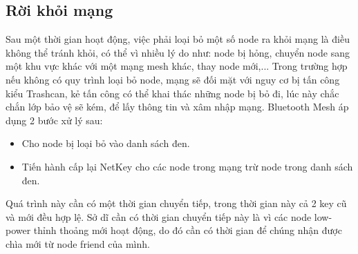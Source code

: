         \subsection{Rời khỏi mạng} \label{removenode}
        Sau một thời gian hoạt động, việc phải loại bỏ một số node ra khỏi mạng là điều không thể tránh khỏi, có thể vì nhiều lý do như: node bị hỏng, chuyển node sang một khu vực khác với một mạng mesh khác, thay node mới,... Trong trường hợp nếu không có quy trình loại bỏ node, mạng sẽ đối mặt với nguy cơ bị tấn công kiểu Trashcan, kẻ tấn công có thể khai thác những node bị bỏ đi, lúc này chắc chắn lớp bảo vệ sẽ kém, để lấy thông tin và xâm nhập mạng. Bluetooth Mesh áp dụng 2 bước xử lý sau:
        \begin{itemize}
            \item Cho node bị loại bỏ vào danh sách đen.
            \item Tiến hành cấp lại NetKey cho các node trong mạng trừ node trong danh sách đen. 
        \end{itemize} 

        Quá trình này cần có một thời gian chuyển tiếp, trong thời gian này cả 2 key cũ và mới đều hợp lệ. Sở dĩ cần có thời gian chuyển tiếp này là vì các node low-power thỉnh thoảng mới hoạt động, do đó cần có thời gian để chúng nhận được chìa mới từ node friend của mình.
